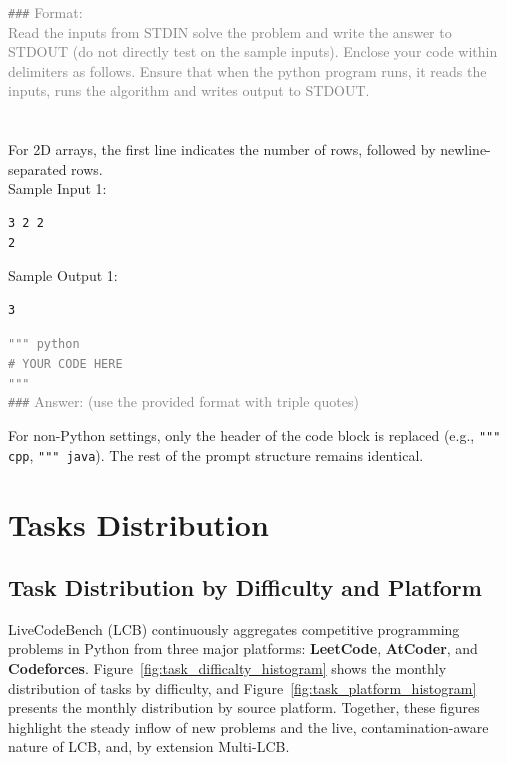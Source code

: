 \documentclass{article} %
\begin{document}
\begin{addedtext}
\textcolor{gray}{
\texttt{\#\#\#} Format: \\ 
Read the inputs from STDIN solve the problem and write the answer to STDOUT (do not directly test on the sample inputs). Enclose your code within delimiters as follows. Ensure that when the python program runs, it reads the inputs, runs the algorithm and writes output to STDOUT.}\\
\\
\\
For 2D arrays, the first line indicates the number of rows, followed by newline-separated rows.  \\

Sample Input 1:  
\begin{verbatim}
3 2 2  
2  
\end{verbatim}

Sample Output 1:  
\begin{verbatim}
3  
\end{verbatim} 

\textcolor{gray}{
\texttt{""" python } \\
\texttt{\# YOUR CODE HERE} \\
\texttt{"""} }
\\

\textcolor{gray}{
\texttt{\#\#\#} Answer: (use the provided format with triple quotes)}
\end{addedtext}

For non-Python settings, only the header of the code block is replaced (e.g., \texttt{""" cpp}, \texttt{""" java}). 
The rest of the prompt structure remains identical.


\section{Tasks Distribution}
\label{app_distribution}


\subsection{Task Distribution by Difficulty and Platform}
\label{app_subsec_platforms}

LiveCodeBench (LCB) continuously aggregates competitive programming problems in Python from three major platforms: \textbf{LeetCode}, \textbf{AtCoder}, and \textbf{Codeforces}.  
Figure~\ref{fig:task_difficalty_histogram} shows the monthly distribution of tasks by difficulty, and Figure~\ref{fig:task_platform_histogram} presents the monthly distribution by source platform.  
Together, these figures highlight the steady inflow of new problems and the live, contamination-aware nature of LCB, and, by extension Multi-LCB.
\end{document}
